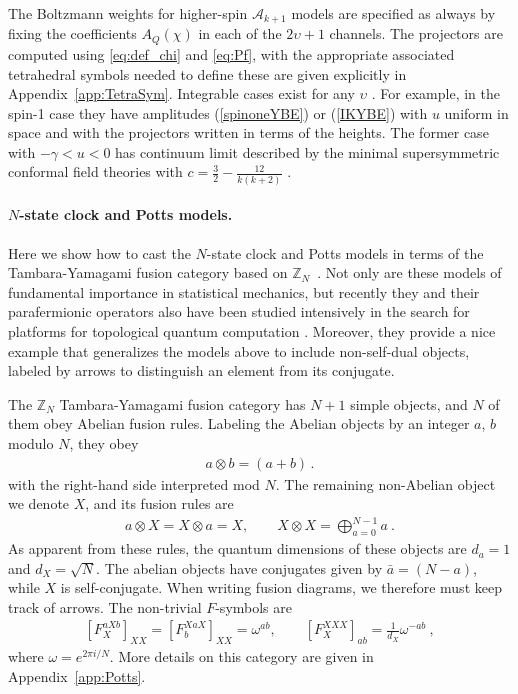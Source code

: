 The Boltzmann weights for higher-spin ${\mathcal A}_{k+1}$ models are specified as always by fixing the coefficients $A_Q(\chi)$ in each of the $2\upsilon+1$ channels. The projectors are computed using \eqref{eq:def_chi} and \eqref{eq:Pf}, with the appropriate associated tetrahedral symbols needed to define these are given explicitly in Appendix~\ref{app:TetraSym}.  Integrable cases exist for any $\upsilon$ \cite{Kulish:1981,Date:1987}. For example, in the spin-1 case they have amplitudes (\ref{spinoneYBE}) or (\ref{IKYBE}) with $u$ uniform in space and with the projectors written in terms of the heights. The former case with $-\gamma<u<0$ has continuum limit described by the minimal supersymmetric conformal field theories with $c = \frac32 - \frac{12}{k(k+2)}$ \cite{Date:1987}.







\paragraph{$N$-state clock and Potts models.}
Here we show how to cast the $N$-state clock and Potts models in terms of the Tambara-Yamagami fusion category based on $\mathbb{Z}_N$~\cite{Tambara1998}.
Not only are these models of fundamental importance in statistical mechanics, but recently they and their parafermionic operators also have been studied intensively in the search for platforms for topological quantum computation \cite{Alicea16}.
Moreover, they provide a nice example that generalizes the models above to include non-self-dual objects, labeled by arrows to distinguish an element from its conjugate. 


The $\mathbb{Z}_N$ Tambara-Yamagami fusion category 
has $N+1$ simple objects, and
$N$ of them obey Abelian fusion rules. Labeling the Abelian objects by an integer $a$, $b$ modulo $N$, they obey
\begin{align}
	a\otimes b = (a+b) \,.
\label{clockabelian}
\end{align}
with the right-hand side interpreted mod $N$.
The remaining non-Abelian object we denote $X$, and its fusion rules are
\begin{align}
	 a \otimes X = X \otimes a = X, \qquad X \otimes X = \bigoplus_{a= 0}^{N-1} a\ .
\label{clockX}
\end{align}
As apparent from these rules, the quantum dimensions of these objects are $d_{a} = 1$ and $d_X = \sqrt{N}$.
The abelian objects have conjugates given by $\bar{a} = (N-a)$, while $X$ is self-conjugate. When writing fusion diagrams, we therefore must keep track of arrows. The non-trivial $F$-symbols are
\begin{align}
	\left[F^{aXb}_X\right]_{XX} =\left[F^{XaX}_b\right]_{XX} = \omega^{ab}, \qquad \left[ F^{XXX}_X\right]_{ab} = \frac{1}{d_X}\omega^{-ab}\ ,
	\label{FPotts}
\end{align}
where $\omega=e^{2\pi i/N}$. More details on this category are given in Appendix~\ref{app:Potts}. 



